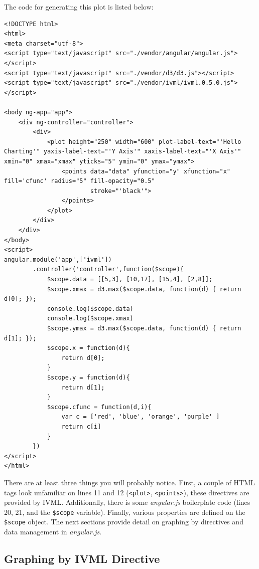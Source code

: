 \documentclass[a4paper,10pt-]{article}
\begin{document}
\noindent The code for generating this plot is listed below:

\lstset{language=HTML,label=ivml}

\begin{lstlisting}
<!DOCTYPE html>
<html>
<meta charset="utf-8">
<script type="text/javascript" src="./vendor/angular/angular.js"></script>
<script type="text/javascript" src="./vendor/d3/d3.js"></script>
<script type="text/javascript" src="./vendor/ivml/ivml.0.5.0.js"></script>

<body ng-app="app">
    <div ng-controller="controller">
        <div>
            <plot height="250" width="600" plot-label-text="'Hello Charting'" yaxis-label-text="'Y Axis'" xaxis-label-text="'X Axis'" xmin="0" xmax="xmax" yticks="5" ymin="0" ymax="ymax">
                <points data="data" yfunction="y" xfunction="x" fill='cfunc' radius="5" fill-opacity="0.5"
                        stroke="'black'">
                </points>
            </plot>
        </div>
    </div>
</body>
<script>
angular.module('app',['ivml'])
        .controller('controller',function($scope){
            $scope.data = [[5,3], [10,17], [15,4], [2,8]];
            $scope.xmax = d3.max($scope.data, function(d) { return d[0]; });
            console.log($scope.data)
            console.log($scope.xmax)
            $scope.ymax = d3.max($scope.data, function(d) { return d[1]; });
            $scope.x = function(d){
                return d[0];
            }
            $scope.y = function(d){
                return d[1];
            }
            $scope.cfunc = function(d,i){
                var c = ['red', 'blue', 'orange', 'purple' ]
                return c[i]
            }
        })
</script>
</html>
\end{lstlisting}

\noindent There are at least three things you will probably notice. First,  a couple of HTML tags look unfamiliar on lines 11 and 12 ({\tt <plot>}, {\tt <points>}), these directives are provided by IVML. Additionally, there is some \emph{angular.js} boilerplate code (lines 20, 21, and the {\tt \$scope} variable). Finally, various properties are defined on the {\tt \$scope} object. The next sections provide detail on graphing by directives and data management in \emph{angular.js}.

\subsection{Graphing by IVML Directive}
\end{document}
